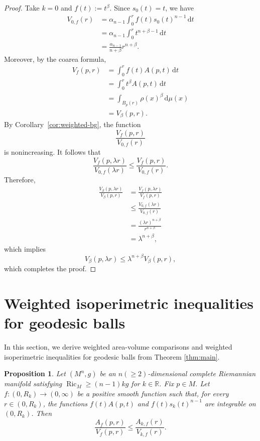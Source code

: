 \documentclass[11pt]{article}
\newtheorem{proposition}[theorem]{Proposition}
\newcommand{\Ric}{\operatorname{Ric}}
\newcommand{\dd}{\,\mathrm{d}}
\begin{document}
\begin{proof}
Take $k=0$ and $f(t):=t^\beta$.  Since $s_0(t)=t$, we have
\begin{align*}
V_{0,f}(r)
&=
\alpha_{n-1}
\int_0^r f(t)s_0(t)^{n-1}\dd t\\
&=
\alpha_{n-1}
\int_0^r t^{n+\beta-1}\dd t\\
&=
\frac{\alpha_{n-1}}{n+\beta}r^{n+\beta}.
\end{align*}
Moreover, by the coarea formula,
\begin{align*}
V_f(p,r)
&=
\int_0^r f(t)A(p,t)\dd t\\
&=
\int_0^r t^\beta A(p,t)\dd t\\
&=
\int_{B_p(r)}\rho(x)^\beta\dd\mu(x)\\
&=
V_\beta(p,r).
\end{align*}
By Corollary~\ref{cor:weighted-bg}, the function
$$
\frac{V_f(p,r)}{V_{0,f}(r)}
$$
is nonincreasing. It follows that
$$
\frac{V_f(p,\lambda r)}{V_{0,f}(\lambda r)}
\leq
\frac{V_f(p,r)}{V_{0,f}(r)}.
$$
Therefore,
\begin{align*}
\frac{V_\beta(p,\lambda r)}
{V_\beta(p,r)}
&=
\frac{V_f(p,\lambda r)}
{V_f(p,r)}\\
&\leq
\frac{V_{0,f}(\lambda r)}
{V_{0,f}(r)}\\
&=
\frac{(\lambda r)^{n+\beta}}
{r^{n+\beta}}\\
&=
\lambda^{n+\beta},
\end{align*}
which implies
$$
V_\beta(p,\lambda r)
\leq
\lambda^{n+\beta}V_\beta(p,r),
$$
which completes the proof.
\end{proof}








\section{Weighted isoperimetric inequalities for geodesic balls} \label{sec:weighted-isoperimetric}


In this section, we derive weighted area-volume comparisons and weighted isoperimetric inequalities for geodesic balls from Theorem \ref{thm:main}.

\begin{proposition}
\label{prop:weighted-area-volume}
Let $(M^n,g)$ be an $n(\geq 2)$-dimensional complete Riemannian manifold satisfying $\Ric_M\geq(n-1)kg$ for $k \in \mathbb{R}$. Fix \(p\in M\). Let $f\colon(0,R_k)\rightarrow(0,\infty)$ be a positive smooth function such that, for every
\(r\in(0,R_k)\), the functions $f(t)A(p,t)$ and $f(t)s_k(t)^{n-1}$ are integrable on \((0,R_k)\). Then 
$$ \frac{A_f(p,r)}{V_f(p,r)} \leq \frac{A_{k,f}(r)}{V_{k,f}(r)}.$$
\end{proposition}
\end{document}
